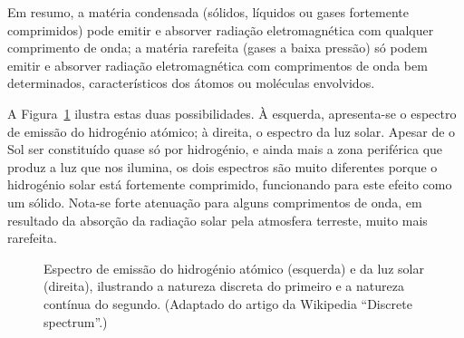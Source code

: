 Em resumo, a matéria condensada (sólidos, líquidos ou gases fortemente
comprimidos) pode emitir e absorver radiação eletromagnética com qualquer
comprimento de onda; a matéria rarefeita (gases a baixa pressão) só podem emitir
e absorver radiação eletromagnética com comprimentos de onda bem determinados,
característicos dos átomos ou moléculas envolvidos.

A Figura~\ref{fig:spectrums} ilustra estas duas possibilidades. À esquerda,
apresenta-se o espectro de emissão do hidrogénio atómico; à direita, o espectro
da luz solar. Apesar de o Sol ser constituído quase só por hidrogénio, e ainda
mais a zona periférica que produz a luz que nos ilumina, os dois
espectros são muito diferentes porque o hidrogénio solar está fortemente
comprimido, funcionando para este efeito como um sólido. Nota-se forte atenuação
para alguns comprimentos de onda, em resultado da absorção da radiação solar
pela atmosfera terreste, muito mais rarefeita.
\begin{figure}[htb]
{\centering
    \hfill
}\par
\caption{Espectro de emissão do hidrogénio atómico (esquerda) e da luz solar
(direita), ilustrando a natureza discreta do primeiro e a natureza contínua do
segundo. (Adaptado do artigo da Wikipedia ``Discrete spectrum''.)
\label{fig:spectrums}}
\end{figure}

\newpage
